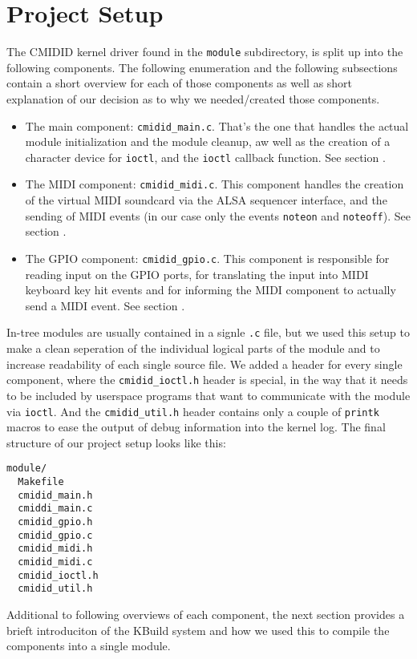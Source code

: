 \documentclass[paper=a4,fontsize=11pt,twocolumn,pagesize,bibtotoc]{scrartcl}
\begin{document}
\section{Project Setup}
\label{michael:setup}

The CMIDID kernel driver found in the \texttt{module} subdirectory, is split
up into the following components. The following enumeration and the following
subsections contain a short overview for each of those components as well as 
short explanation of our decision as to why we needed/created those components.
\begin{itemize}
  \item The main component: \texttt{cmidid\_main.c}. That's the one that 
    handles the actual module initialization and the module cleanup, aw well 
    as the creation of a character device for \texttt{ioctl}, and the 
    \texttt{ioctl} callback function. See section \textbf{}.
  \item The MIDI component: \texttt{cmidid\_midi.c}. This component handles 
    the creation of the virtual MIDI soundcard via the ALSA sequencer 
    interface, and the sending of MIDI events (in our case only the events 
    \texttt{noteon} and \texttt{noteoff}). See section \textbf{}.
  \item The GPIO component: \texttt{cmidid\_gpio.c}. This component is 
    responsible for reading input on the GPIO ports, for translating the 
    input into MIDI keyboard key hit events and for informing the MIDI 
    component to actually send a MIDI event. See section \textbf{}.
\end{itemize}
In-tree modules are usually contained in a signle \texttt{.c} file, but we 
used this setup to make a clean seperation of the individual logical parts of 
the module and to increase readability of each single source file. We added 
a header for every single component, where the \texttt{cmidid\_ioctl.h} header 
is special, in the way that it needs to be included by userspace programs that
want to communicate with the module via \texttt{ioctl}. And the \texttt{cmidid\_util.h}
header contains only a couple of \texttt{printk} macros to ease the output of 
debug information into the kernel log. The final structure of our project 
setup looks like this:
\begin{lstlisting}
module/
  Makefile
  cmidid_main.h
  cmiddi_main.c
  cmidid_gpio.h
  cmidid_gpio.c
  cmidid_midi.h
  cmidid_midi.c
  cmidid_ioctl.h
  cmidid_util.h
\end{lstlisting}
Additional to following overviews of each component, the next section provides
a brieft introduciton of the KBuild system and how we used this to compile 
the components into a single module.
\end{document}
